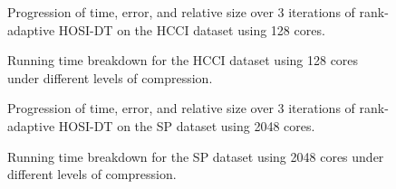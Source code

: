         \begin{figure}
            \centering
            \renewcommand{\datapath}{data/HCCI/N1_n128}
            \renewcommand{\thresh}{1e-01,5e-02,1e-02}
            
            \caption{Progression of time, error, and relative size over 3 iterations of rank-adaptive HOSI-DT on the HCCI dataset using 128 cores.}
            \label{fig:HCCI}
        \end{figure}
        \begin{figure}
            \centering
            \renewcommand{\datapath}{data/HCCI/N1_n128}
            \renewcommand{\thresh}{1e-01,5e-02,1e-02}
            
            \caption{Running time breakdown for the HCCI dataset using 128 cores under different levels of compression.}
            \label{fig:HCCI_breakdown}
        \end{figure}
        

        \begin{figure}
            \centering
            \renewcommand{\datapath}{data/SP/N16_n2048}
            \renewcommand{\thresh}{1e-01,5e-02,1e-02}
            
            \caption{Progression of time, error, and relative size over 3 iterations of rank-adaptive HOSI-DT on the SP dataset using 2048 cores.}
            \label{fig:SP}
        \end{figure}

        \begin{figure}
            \centering
            \renewcommand{\datapath}{data/SP/N16_n2048}
            \renewcommand{\thresh}{1e-01,5e-02,1e-02}
            
            \caption{Running time breakdown for the SP dataset using 2048 cores under different levels of compression.}
            \label{fig:SP_breakdown}
        \end{figure}



